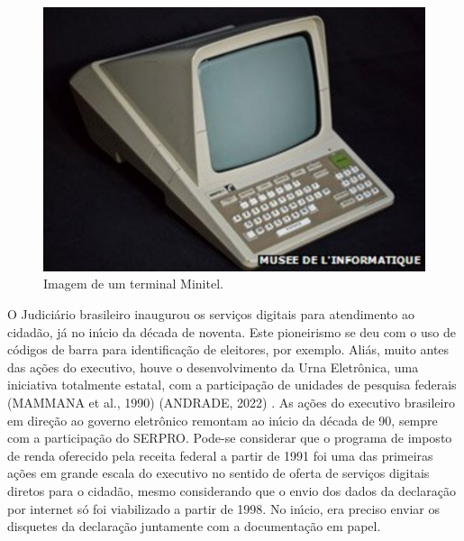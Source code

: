 \documentclass[
12pt,		%
openright,	%
twoside,  %
a4paper,			%
chapter=TITLE,		%
english,			%
french,				%
spanish,			%
brazil				%
]{USPSC-classe/USPSC}
\begin{document}
\captionsetup{format=plain}
\begin{figure}[max size={\textwidth}{\textheight}]

\centering


\begin{minipage}[b]{0.4\linewidth}
        \centering
                \includegraphics[width=1.0\linewidth]{../../imagens/minitel.jpg}
                \caption{Imagem de um terminal Minitel.}
                \label{5d9a2782548e094108d5241aeff768916b33be6c}
\end{minipage}%
\hspace{0.5cm}
\end{figure}



O Judici\'ario brasileiro inaugurou os servi\c{c}os digitais para atendimento ao cidad\~ao, j\'a no in\'{\i}cio da d\'ecada de noventa. Este pioneirismo se deu com o uso de c\'odigos de barra para identifica\c{c}\~ao de eleitores, por exemplo. Ali\'as, muito antes das a\c{c}\~oes do executivo, houve o desenvolvimento da Urna Eletr\^onica, uma iniciativa totalmente estatal, com a participa\c{c}\~ao de unidades de pesquisa federais  (MAMMANA et al., 1990)  (ANDRADE, 2022) . As a\c{c}\~oes do executivo brasileiro em dire\c{c}\~ao ao governo eletr\^onico remontam ao in\'{\i}cio da d\'ecada de 90, sempre com a participa\c{c}\~ao do SERPRO. Pode-se considerar que o programa de imposto de renda oferecido pela receita federal a partir de 1991 foi uma das primeiras a\c{c}\~oes em grande escala do executivo no sentido de oferta de servi\c{c}os digitais diretos para o cidad\~ao, mesmo considerando que o envio dos dados da declara\c{c}\~ao por internet s\'o foi viabilizado a partir de 1998. No in\'{\i}cio, era preciso enviar os disquetes da declara\c{c}\~ao juntamente com a documenta\c{c}\~ao em papel.
\end{document}
